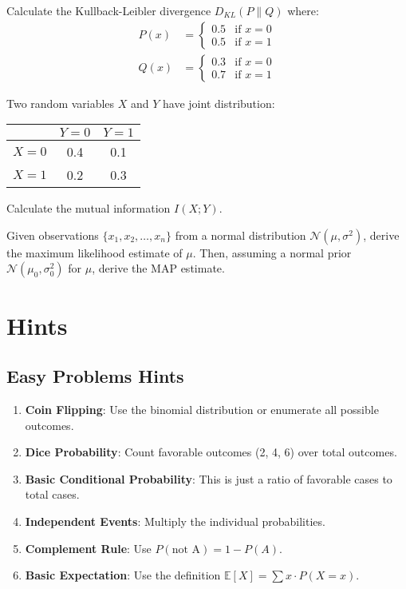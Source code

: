 \begin{problem}[KL Divergence]
Calculate the Kullback-Leibler divergence $D_{KL}(P \| Q)$ where:
\begin{align}
P(x) &= \begin{cases} 0.5 & \text{if } x = 0 \\ 0.5 & \text{if } x = 1 \end{cases} \\
Q(x) &= \begin{cases} 0.3 & \text{if } x = 0 \\ 0.7 & \text{if } x = 1 \end{cases}
\end{align}
\end{problem}

\begin{problem}
Two random variables $X$ and $Y$ have joint distribution:
\begin{center}
\begin{tabular}{|c|c|c|}
\hline
 & $Y=0$ & $Y=1$ \\
\hline
$X=0$ & 0.4 & 0.1 \\
$X=1$ & 0.2 & 0.3 \\
\hline
\end{tabular}
\end{center}
Calculate the mutual information $I(X; Y)$.
\end{problem}

\begin{problem}
Given observations $\{x_1, x_2, \ldots, x_n\}$ from a normal distribution $\mathcal{N}(\mu, \sigma^2)$, derive the maximum likelihood estimate of $\mu$. Then, assuming a normal prior $\mathcal{N}(\mu_0, \sigma_0^2)$ for $\mu$, derive the MAP estimate.
\end{problem}

\section*{Hints}

\subsection*{Easy Problems Hints}

\begin{enumerate}
\item \textbf{Coin Flipping}: Use the binomial distribution or enumerate all possible outcomes.
\item \textbf{Dice Probability}: Count favorable outcomes (2, 4, 6) over total outcomes.
\item \textbf{Basic Conditional Probability}: This is just a ratio of favorable cases to total cases.
\item \textbf{Independent Events}: Multiply the individual probabilities.
\item \textbf{Complement Rule}: Use $P(\text{not A}) = 1 - P(A)$.
\item \textbf{Basic Expectation}: Use the definition $\mathbb{E}[X] = \sum x \cdot P(X=x)$.
\end{enumerate}

